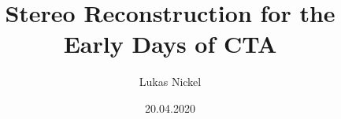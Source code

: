 \documentclass[
  oneside, %
  tucolor,       %
  BCOR=0mm,     %
  parskip=half,  %
  open=any,      %
  cleardoublepage=plain,  %
]{tudothesis}
\author{Lukas Nickel}
\title{Stereo Reconstruction for the Early Days of CTA}
\date{20.04.2020}
\begin{document}
\frontmatter
\maketitle

\makecorrectorpage


\tableofcontents

\mainmatter
%









% 





% 
\end{document}
